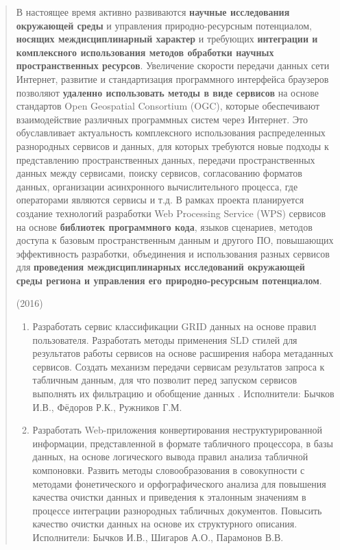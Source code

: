 \documentclass[12pt,a4paper]{ltxdoc}
\begin{document}
\begin{quote}
В настоящее время активно развиваются \textbf{научные исследования окружающей среды} и управления природно-ресурсным потенциалом, \textbf{носящих междисциплинарный характер} и требующих \textbf{интеграции и комплексного использования методов обработки научных пространственных ресурсов}. Увеличение скорости передачи данных сети Интернет, развитие и стандартизация программного интерфейса браузеров позволяют \textbf{удаленно использовать методы в виде сервисов} на основе стандартов Open Geospatial Consortium (OGC), которые обеспечивают взаимодействие различных программных систем через Интернет. Это обуславливает актуальность комплексного использования распределенных разнородных сервисов и данных, для которых требуются новые подходы к представлению пространственных данных, передачи пространственных данных между сервисами, поиску сервисов, согласованию форматов данных, организации асинхронного вычислительного процесса, где операторами являются сервисы и т.д. В рамках проекта планируется создание технологий разработки Web Processing Service (WPS) сервисов на основе\textbf{ библиотек программного кода}, языков сценариев, методов доступа к базовым пространственным данным и другого ПО, повышающих эффективность разработки, объединения и использования разных сервисов для \textbf{проведения междисциплинарных исследований окружающей среды региона и управления его природно-ресурсным потенциалом}.

(2016)
\begin{enumerate}
\item Разработать сервис классификации GRID данных на основе правил пользователя. Разработать методы применения SLD стилей для результатов работы сервисов на основе расширения набора метаданных сервисов. Создать механизм передачи сервисам результатов запроса к табличным данным, для что позволит перед запуском сервисов выполнять их фильтрацию и обобщение данных . Исполнители: Бычков И.В., Фёдоров Р.К., Ружников Г.М.

\item Разработать Web-приложения конвертирования неструктурированной информации, представленной в формате табличного процессора, в базы данных, на основе логического вывода правил анализа табличной компоновки. Развить методы словообразования в совокупности с методами фонетического и орфографического анализа для повышения качества очистки данных и приведения к эталонным значениям в процессе интеграции разнородных табличных документов. Повысить качество очистки данных на основе их структурного описания. Исполнители: Бычков И.В., Шигаров А.О., Парамонов В.В.


\end{enumerate}
\end{quote}
\end{document}
